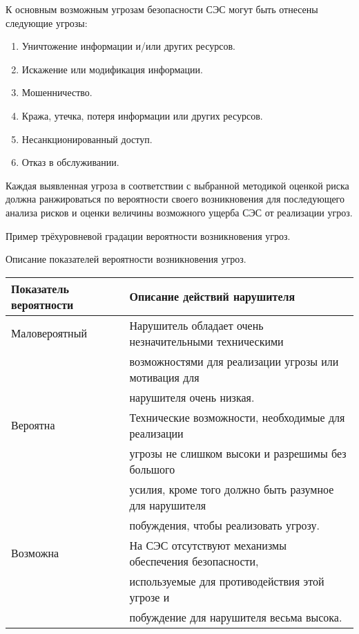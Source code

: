 \documentclass[12pt, russian, oneside, article]{ncc}
\begin{document}
К основным возможным угрозам безопасности СЭС могут быть отнесены следующие угрозы:
\begin{enumerate}
\item Уничтожение информации и/или других ресурсов.
\item Искажение или модификация информации.
\item Мошенничество.
\item Кража, утечка, потеря информации или других ресурсов.
\item Несанкционированный доступ.
\item Отказ в обслуживании.
\end{enumerate}

Каждая выявленная угроза в соответствии с выбранной методикой оценкой риска должна ранжироваться по вероятности своего возникновения для последующего анализа рисков и оценки величины возможного ущерба СЭС от реализации угроз.

Пример трёхуровневой градации вероятности возникновения угроз.

Описание показателей вероятности возникновения угроз.


\begin{center}
\begin{tabular}{ll}
 Показатель вероятности  &  Описание действий нарушителя                            \\
\hline
 Маловероятный           &  Нарушитель обладает очень незначительными техническими  \\
                         &  возможностями для реализации угрозы или мотивация для   \\
                         &  нарушителя очень низкая.                                \\
\hline
 Вероятна                &  Технические возможности, необходимые для реализации     \\
                         &  угрозы не слишком высоки и разрешимы без большого       \\
                         &  усилия, кроме того должно быть разумное для нарушителя  \\
                         &  побуждения, чтобы реализовать угрозу.                   \\
\hline
 Возможна                &  На СЭС отсутствуют механизмы обеспечения безопасности,  \\
                         &  используемые для противодействия этой угрозе и          \\
                         &  побуждение для нарушителя весьма высока.                \\
\end{tabular}
\end{center}
\end{document}
